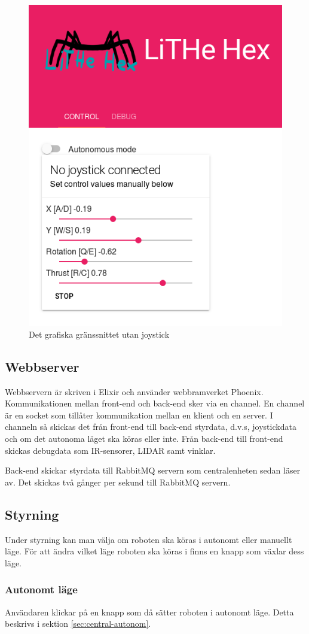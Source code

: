 \documentclass[a4paper,titlepage,12pt]{article}
\begin{document}
	\begin{figure}[h]
		\centering
		\includegraphics[width=0.5\linewidth]{images/gui-index.png}
		\caption{Det grafiska gränssnittet utan joystick\label{fig:gui-overview}}
	\end{figure}

	\subsection{Webbserver}
	Webbservern är skriven i Elixir och använder webbramverket Phoenix.
    Kommunikationen mellan front-end och back-end sker via en channel. En channel
    är en socket som tillåter kommunikation mellan en klient och en server. I
    channeln så skickas det från front-end till back-end styrdata, d.v.s,
    joystickdata och om det autonoma läget ska köras eller inte. Från back-end
    till front-end skickas debugdata som IR-sensorer, LIDAR samt vinklar.
		
	Back-end skickar styrdata till RabbitMQ servern som centralenheten sedan
	läser av. Det skickas två gånger per sekund till RabbitMQ servern.

    \subsection{Styrning}
    Under styrning kan man välja om roboten ska köras i autonomt eller manuellt läge.
    För att ändra vilket läge roboten ska köras i finns en knapp som växlar dess läge.
    
    \subsubsection{Autonomt läge}
    Användaren klickar på en knapp som då sätter roboten i autonomt läge. Detta beskrivs i 
    sektion \ref{sec:central-autonom}.
    
\end{document}
